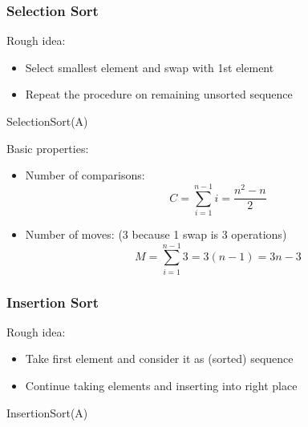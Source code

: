 \subsubsection{Selection Sort}
Rough idea: 
\begin{itemize}
    \item Select smallest element and swap with 1st element
    \item Repeat the procedure on remaining unsorted sequence
\end{itemize}

\begin{center}
\begin{minipage}{0.6\textwidth} %
\centering %
\begin{algorithm}[H]
\caption{SelectionSort(A)}
\end{algorithm}
\end{minipage}
\end{center}

Basic properties:
\begin{itemize}
    \item Number of comparisons:
    \[
    C= \sum_{i=1}^{n-1} i = \frac{n^2-n}{2}
    \]
    \item Number of moves: (3 because 1 swap is 3 operations) \[
    M= \sum_{i=1}^{n-1} 3=3(n-1)=3n-3
    \]
\end{itemize}

\subsubsection{Insertion Sort}
Rough idea:
\begin{itemize}
    \item Take first element and consider it as (sorted) sequence
    \item Continue taking elements and inserting into right place
\end{itemize}

\begin{center}
\begin{minipage}{0.6\textwidth} %
\centering %
\begin{algorithm}[H]
\caption{InsertionSort(A)}
\end{algorithm}
\end{minipage}
\end{center}

